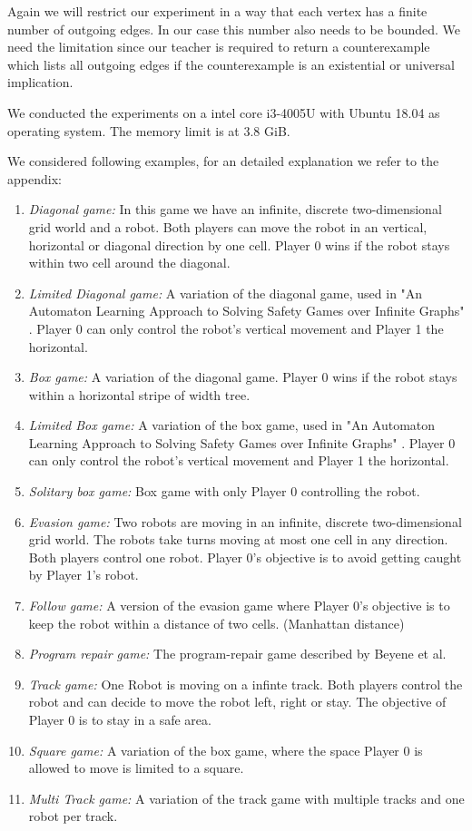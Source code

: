 \documentclass[10pt,a4paper]{article}
\theoremstyle{plain}
\theoremstyle{definition}
\begin{document}
Again we will restrict our experiment in a way that each vertex has a finite number of outgoing edges. In our case this number also needs to be bounded. We need the limitation since our teacher is required to return a counterexample which lists all outgoing edges if the counterexample is an existential or universal implication.

We conducted the experiments on a intel core i3-4005U with Ubuntu 18.04 as operating system. The memory limit is at 3.8 GiB.

We considered following examples, for an detailed explanation we refer to the appendix:

\begin{enumerate}
\item \emph{Diagonal game:} In this game we have an infinite, discrete two-dimensional grid world and a robot. Both players can move the robot in an vertical, horizontal or diagonal direction by one cell. Player 0 wins if the robot stays within two cell around the diagonal.
\item \emph{Limited Diagonal game:} A variation of the diagonal game, used in "An Automaton Learning Approach to Solving Safety Games over Infinite Graphs" \cite{neider2016automaton}. Player 0 can only control the robot's vertical movement and Player 1 the horizontal.
\item \emph{Box game:} A variation of the diagonal game. Player 0 wins if the robot stays within a horizontal stripe of width tree.
\item \emph{Limited Box game:} A variation of the box game, used in "An Automaton Learning Approach to Solving Safety Games over Infinite Graphs" \cite{neider2016automaton}. Player 0 can only control the robot's vertical movement and Player 1 the horizontal.
\item \emph{Solitary box game:} Box game with only Player 0 controlling the robot.
\item \emph{Evasion game:} Two robots are moving in an infinite, discrete two-dimensional grid world. The robots take turns moving at most one cell in any direction. Both players control one robot. Player 0's objective is to avoid getting caught by Player 1's robot.
\item \emph{Follow game:} A version of the evasion game where Player 0's objective is to keep the robot within a distance of two cells. (Manhattan distance)
\item \emph{Program repair game:} The program-repair game described by Beyene et al. \cite{beyene2014constraint}
\item \emph{Track game:} One Robot is moving on a infinte track. Both players control the robot and can decide to move the robot left, right or stay. The objective of Player 0 is to stay in a safe area.
\item \emph{Square game:} A variation of the box game, where the space Player 0 is allowed to move is limited to a square.
\item \emph{Multi Track game:} A variation of the track game with multiple tracks and one robot per track.
\end{enumerate}
\end{document}
